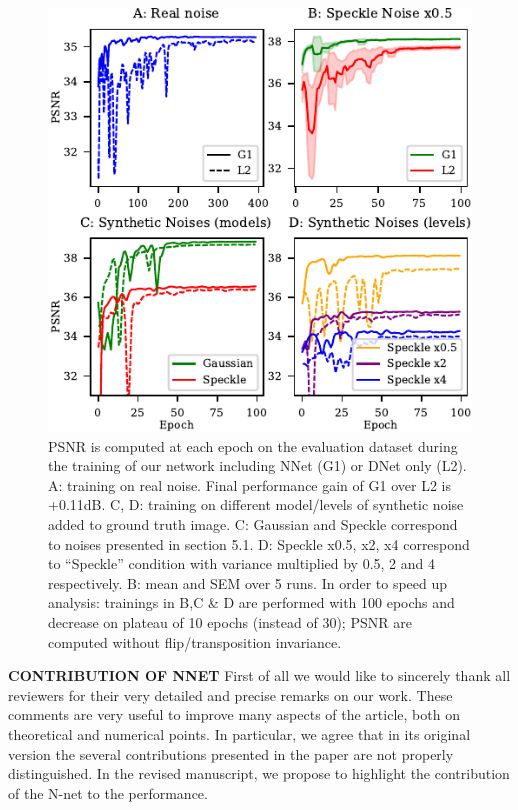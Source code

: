 \documentclass{article}
\begin{document}

\begin{figure}
\begin{center}
\includegraphics[width=\columnwidth]{fig_review.pdf}
\vskip -0.15in
\caption{PSNR is computed at each epoch on the evaluation dataset during the training of our network including NNet (G1) or DNet only (L2). A: training on real noise. Final performance gain of G1 over L2 is +0.11dB. C, D: training on different model/levels of synthetic noise added to ground truth image. C: Gaussian and Speckle correspond to noises presented in section 5.1. D: Speckle x0.5, x2, x4 correspond to “Speckle” condition with variance multiplied by 0.5, 2 and 4 respectively. B: mean and SEM over 5 runs. In order to speed up analysis: trainings in B,C \& D are performed with 100 epochs and decrease on plateau of 10 epochs (instead of 30); PSNR are computed without flip/transposition invariance.}
\label{fig:review}
\end{center}
\vskip -0.35in
\end{figure}

\textbf{CONTRIBUTION OF NNET}
First of all we would like to sincerely thank all reviewers for their very detailed and precise remarks on our work. These comments are very useful to improve many aspects of the article, both on theoretical and numerical points. In particular, we agree that in its original version the several contributions presented in the paper are not properly distinguished. In the revised manuscript, we propose to highlight the contribution of the N-net to the performance.
\end{document}

